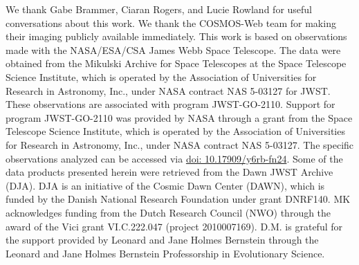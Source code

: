 \documentclass{aa}
\begin{document}
\begin{acknowledgements}
    We thank Gabe Brammer, Ciaran Rogers, and Lucie Rowland for useful conversations about this work.
    We thank the COSMOS-Web team for making their imaging publicly available immediately. 
    This work is based on observations made with the NASA/ESA/CSA James Webb Space Telescope. The data were obtained from the Mikulski Archive for Space Telescopes at the Space Telescope Science Institute, which is operated by the Association of Universities for Research in Astronomy, Inc., under NASA contract NAS 5-03127 for JWST. These observations are associated with program JWST-GO-2110. Support for program JWST-GO-2110 was provided by NASA through a grant from the Space Telescope Science Institute, which is operated by the Association of Universities for Research in Astronomy, Inc., under NASA contract NAS 5-03127. The specific observations analyzed can be accessed via \href{http://dx.doi.org/10.17909/y6rb-fn24}{doi: 10.17909/y6rb-fn24}.
    Some of the data products presented herein were retrieved from the Dawn JWST Archive (DJA). DJA is an initiative of the Cosmic Dawn Center (DAWN), which is funded by the Danish National Research Foundation under grant DNRF140.
    MK acknowledges funding from the Dutch Research Council (NWO) through the award of the Vici grant VI.C.222.047 (project 2010007169).
    D.M. is grateful for the support provided by Leonard and Jane Holmes Bernstein through the Leonard and Jane Holmes Bernstein Professorship in Evolutionary Science.
\end{acknowledgements}


\end{document}
